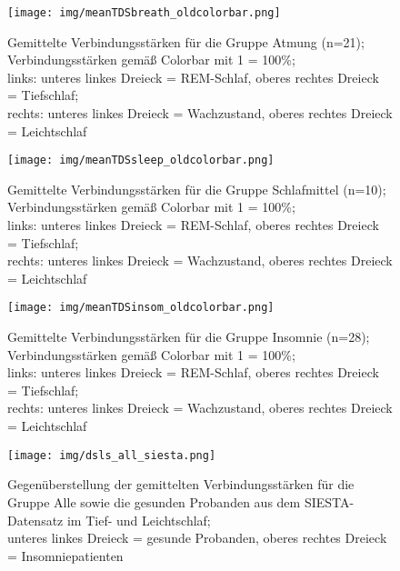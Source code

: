 \begin{figure}[H]
	\centering
	\texttt{[image: img/meanTDSbreath\_oldcolorbar.png]}
	\caption[Verbindungsstärken für die Gruppe Atmung]{Gemittelte Verbindungsstärken für die Gruppe Atmung (n=21);\\Verbindungsstärken gemäß Colorbar mit 1 = 100\%;\\links: unteres linkes Dreieck = \acs{REM}-Schlaf, oberes rechtes Dreieck = Tiefschlaf;\\rechts: unteres linkes Dreieck = Wachzustand, oberes rechtes Dreieck = Leichtschlaf}
	\label{fig:meanTDSbreath}
\end{figure}

\begin{figure}[H]
	\centering
	\texttt{[image: img/meanTDSsleep\_oldcolorbar.png]}
	\caption[Verbindungsstärken für die Gruppe Schlafmittel]{Gemittelte Verbindungsstärken für die Gruppe Schlafmittel (n=10);\\Verbindungsstärken gemäß Colorbar mit 1 = 100\%;\\links: unteres linkes Dreieck = \acs{REM}-Schlaf, oberes rechtes Dreieck = Tiefschlaf;\\rechts: unteres linkes Dreieck = Wachzustand, oberes rechtes Dreieck = Leichtschlaf}
	\label{fig:meanTDSsleep}
\end{figure}

\begin{figure}[H]
	\centering
	\texttt{[image: img/meanTDSinsom\_oldcolorbar.png]}
	\caption[Verbindungsstärken für die Gruppe Insomnie]{Gemittelte Verbindungsstärken für die Gruppe Insomnie (n=28);\\Verbindungsstärken gemäß Colorbar mit 1 = 100\%;\\links: unteres linkes Dreieck = \acs{REM}-Schlaf, oberes rechtes Dreieck = Tiefschlaf;\\rechts: unteres linkes Dreieck = Wachzustand, oberes rechtes Dreieck = Leichtschlaf}
	\label{fig:meanTDSinsom}
\end{figure}




\begin{figure}[H]
	\centering
	\texttt{[image: img/dsls\_all\_siesta.png]}
	\caption[Verbindungsstärken für die Gruppe Alle und den SIESTA-Datensatz im Tief- und Leichtschlaf]{Gegenüberstellung der gemittelten Verbindungsstärken für die Gruppe Alle sowie die gesunden Probanden aus dem SIESTA-Datensatz im Tief- und Leichtschlaf;\\unteres linkes Dreieck = gesunde Probanden, oberes rechtes Dreieck = Insomniepatienten}
	\label{fig:dsls_all_siesta}
\end{figure}

